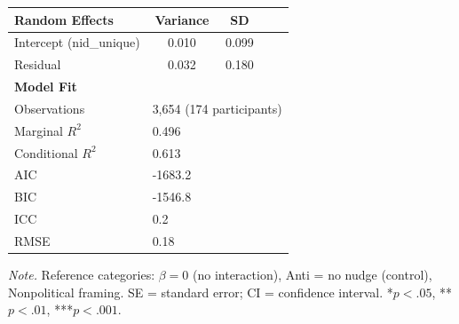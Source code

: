 \begin{table}[H]
\begin{tabularx}{\linewidth}{Xcccc}
\midrule
\textbf{Random Effects} & \textbf{Variance} & \textbf{SD} & & \\
\midrule
Intercept (nid\_unique) & 0.010 & 0.099 & & \\
Residual & 0.032 & 0.180 & & \\

\midrule
\textbf{Model Fit} & & & & \\
\midrule
Observations & \multicolumn{4}{l}{3,654 (174 participants)} \\
Marginal $R^2$ & \multicolumn{4}{l}{0.496} \\
Conditional $R^2$ & \multicolumn{4}{l}{0.613} \\
AIC & \multicolumn{4}{l}{-1683.2} \\
BIC & \multicolumn{4}{l}{-1546.8} \\
ICC & \multicolumn{4}{l}{0.2} \\
RMSE & \multicolumn{4}{l}{0.18} \\

\bottomrule
\end{tabularx}

\vspace{0.6em}
{\footnotesize
\setlength{\baselineskip}{12pt}
\textit{Note.} Reference categories: $\beta = 0$ (no interaction), Anti = no nudge (control), Nonpolitical framing. SE = standard error; CI = confidence interval. *$p < .05$, **$p < .01$, ***$p < .001$.
\par}
\endgroup
\end{table}
